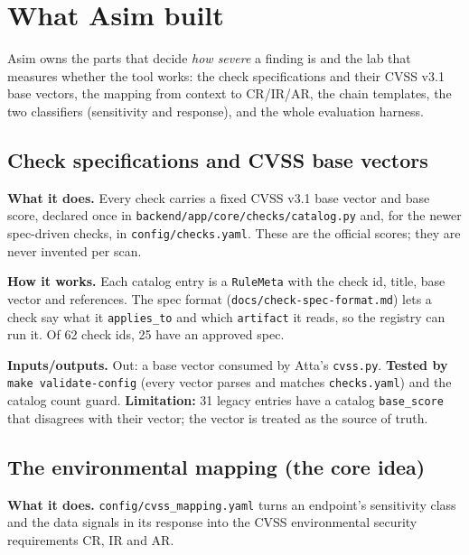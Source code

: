 

\maketitlepage
\tableofcontents
\clearpage


\clearpage

\section{What Asim built}
Asim owns the parts that decide \emph{how severe} a finding is and the lab that
measures whether the tool works: the check specifications and their CVSS v3.1
base vectors, the mapping from context to CR/IR/AR, the chain templates, the two
classifiers (sensitivity and response), and the whole evaluation
harness.

\subsection{Check specifications and CVSS base vectors}
\textbf{What it does.} Every check carries a fixed CVSS v3.1 base vector and base
score, declared once in \texttt{backend/app/core/checks/catalog.py} and, for the
newer spec-driven checks, in \texttt{config/checks.yaml}. These are the official
scores; they are never invented per scan.

\textbf{How it works.} Each catalog entry is a \texttt{RuleMeta} with the check
id, title, base vector and references. The spec format
(\texttt{docs/check-spec-format.md}) lets a check say what it \texttt{applies\_to}
and which \texttt{artifact} it reads, so the registry can run it. Of 62 check
ids, 25 have an approved spec.


\textbf{Inputs/outputs.} Out: a base vector consumed by Atta's
\texttt{cvss.py}. \textbf{Tested by} \texttt{make validate-config} (every vector
parses and matches \texttt{checks.yaml}) and the catalog count guard.
\textbf{Limitation:} 31 legacy entries have a catalog \texttt{base\_score} that
disagrees with their vector; the vector is treated as the source of truth.

\subsection{The environmental mapping (the core idea)}
\textbf{What it does.} \texttt{config/cvss\_mapping.yaml} turns an endpoint's
sensitivity class and the data signals in its response into the CVSS
environmental security requirements CR, IR and AR.

